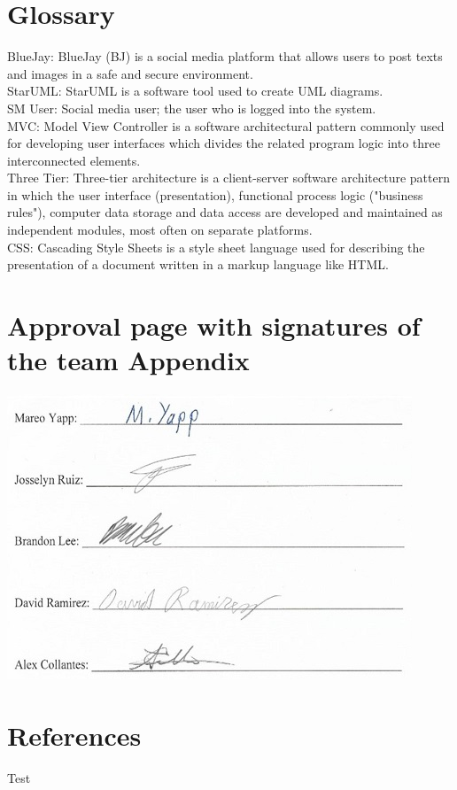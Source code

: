 \documentclass{report}
\begin{document}
\chapter{Glossary}
BlueJay: BlueJay (BJ) is a social media platform that allows users to post texts and images in a safe and secure environment.\\
StarUML: StarUML is a software tool used to create UML diagrams.\\
SM User: Social media user; the user who is logged into the system.\\
MVC: Model View Controller is a software architectural pattern commonly used for developing user interfaces which divides the related program logic into three interconnected elements.\\
Three Tier: Three-tier architecture is a client-server software architecture pattern in which the user interface (presentation), functional process logic ("business rules"), computer data storage and data access are developed and maintained as independent modules, most often on separate platforms.\\
CSS: Cascading Style Sheets is a style sheet language used for describing the presentation of a document written in a markup language like HTML.\\

\chapter{Approval page with signatures of the team Appendix} 
\includegraphics{Signatures}
\newpage

\chapter{References}
Test
\newpage
\end{document}
